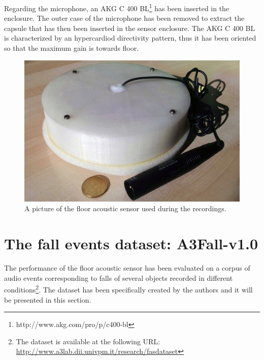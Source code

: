 Regarding the microphone, an AKG C 400 BL\footnote{http://www.akg.com/pro/p/c400-bl} has been inserted in the enclosure. The outer case of the microphone has been removed to extract the capsule that has then been inserted in the sensor enclosure. The AKG C 400 BL is characterized by an hypercardiod directivity pattern, thus it has been oriented so that the maximum gain is towards floor.

\begin{figure}[t]
	\centering
	\includegraphics[width=0.8\columnwidth]{img/FAS_front_little.jpg}
	\caption{A picture of the floor acoustic sensor used during the recordings.} \label{fig:meringa}
\end{figure}

\section{The fall events dataset: A3Fall-v1.0}\label{sec:dataset}
The performance of the floor acoustic sensor has been evaluated on a corpus of audio events corresponding to falls of several objects recorded in different conditions\footnote{The dataset is available at the following URL: \url{http://www.a3lab.dii.univpm.it/research/fasdataset}}. The dataset has been specifically created by the authors and it will be presented in this section.

